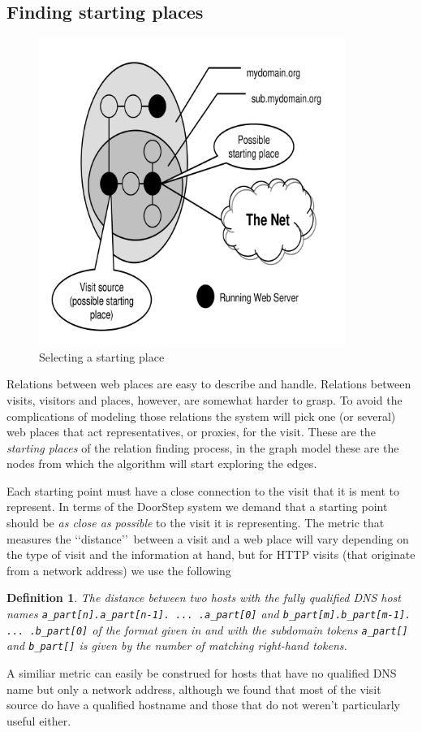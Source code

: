 \documentclass[a4paper]{danarticle}
\newtheorem{definition}{Definition}
\theoremstyle{remark}
\begin{document}
    \subsection{Finding starting places}
       \begin{figure}[ht]
       \centering
	 \includegraphics[width=10cm]{startingplace}
	 \caption{Selecting a starting place}
	 \label{startingplace}
       \end{figure}
       Relations between web places are easy to describe and handle. Relations
       between visits, visitors and places, however, are somewhat harder to
       grasp. To avoid the complications of modeling those relations the system
       will pick one (or several) web places that act representatives, or
       proxies, for the visit. These are the \textit{starting places} of the 
       relation finding process,
       in the graph model these are the nodes from which the algorithm will
       start exploring the edges. 
       
       Each starting point must have a close connection to the visit that it is
       ment to represent. In terms of the DoorStep system we demand that a
       starting point should be \textit{as close as possible} to the visit it is
       representing. The metric that measures the \lq\lq distance\rq\rq\ between
       a visit and a web place will vary depending on the type of visit and the
       information at hand, but for HTTP visits (that originate from a network
       address) we use the following
       \begin{definition}
       \label{metric}
       The distance between two hosts with the fully qualified DNS host names
       \verb$a_part[n].a_part[n-1]. ... .a_part[0]$ and 
       \verb$b_part[m].b_part[m-1]. ... .b_part[0]$ of the format given in
       \cite{dns} and with the subdomain tokens \verb$a_part[]$ and 
       \verb$b_part[]$ is given by the number of matching right-hand tokens.
       \end{definition}
       A similiar metric can easily be construed for hosts that have no
       qualified DNS name but only a network address, although we found that
       most of the visit source do have a qualified hostname and those that do
       not weren't particularly useful either.
       
\end{document}
